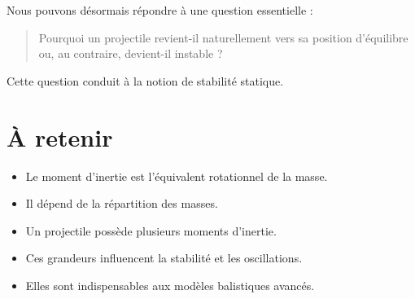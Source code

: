 Nous pouvons désormais répondre à une question essentielle :

\begin{quote}
Pourquoi un projectile revient-il naturellement vers sa position d'équilibre
ou, au contraire, devient-il instable ?
\end{quote}

Cette question conduit à la notion de stabilité statique.

\section{À retenir}

\begin{aretenir}

\begin{itemize}
    \item Le moment d'inertie est l'équivalent rotationnel de la masse.
    \item Il dépend de la répartition des masses.
    \item Un projectile possède plusieurs moments d'inertie.
    \item Ces grandeurs influencent la stabilité et les oscillations.
    \item Elles sont indispensables aux modèles balistiques avancés.
\end{itemize}

\end{aretenir}
